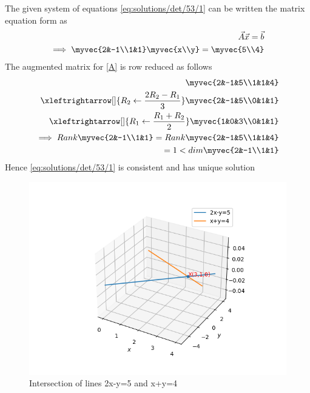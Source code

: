 The given system of equations \eqref{eq:solutions/det/53/1} can be written the matrix equation form as
\begin{align}
    \vec{A}\vec{x}=\vec{b}\\
    \label{A}
    \implies \myvec{2&-1\\1&1}\myvec{x\\y}=\myvec{5\\4}
\end{align}
The augmented matrix for \eqref{A} is row reduced as follows
\begin{align}
    \myvec{2&-1&5\\1&1&4}\\
    \xleftrightarrow[]{R_2\leftarrow \frac{2R_2-R_1}{3}}
    \myvec{2&-1&5\\0&1&1}\\
    \xleftrightarrow[]{R_1\leftarrow \frac{R_1+R_2}{2}}
    \myvec{1&0&3\\0&1&1}\\
    \implies Rank\myvec{2&-1\\1&1}=Rank\myvec{2&-1&5\\1&1&4}
    \\=1 < dim\myvec{2&-1\\1&1}
\end{align}
Hence \eqref{eq:solutions/det/53/1} is consistent and has unique solution \\
\begin{figure}[!ht]
\centering
\includegraphics[width=\columnwidth]{./solutions/det/53/Plot_3D.png}
\caption{Intersection of lines 2x-y=5 and x+y=4}
\label{fig1solutions/det/53/}
\end{figure}
